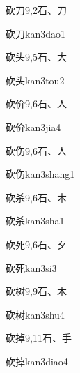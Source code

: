 \begin{entry}{砍刀}{9,2}{⽯、⼑}
  \begin{phonetics}{砍刀}{kan3dao1}
  \end{phonetics}
\end{entry}

\begin{entry}{砍头}{9,5}{⽯、⼤}
  \begin{phonetics}{砍头}{kan3tou2}
  \end{phonetics}
\end{entry}

\begin{entry}{砍价}{9,6}{⽯、⼈}
  \begin{phonetics}{砍价}{kan3jia4}
  \end{phonetics}
\end{entry}

\begin{entry}{砍伤}{9,6}{⽯、⼈}
  \begin{phonetics}{砍伤}{kan3shang1}
  \end{phonetics}
\end{entry}

\begin{entry}{砍杀}{9,6}{⽯、⽊}
  \begin{phonetics}{砍杀}{kan3sha1}
  \end{phonetics}
\end{entry}

\begin{entry}{砍死}{9,6}{⽯、⽍}
  \begin{phonetics}{砍死}{kan3si3}
  \end{phonetics}
\end{entry}

\begin{entry}{砍树}{9,9}{⽯、⽊}
  \begin{phonetics}{砍树}{kan3shu4}
  \end{phonetics}
\end{entry}

\begin{entry}{砍掉}{9,11}{⽯、⼿}
  \begin{phonetics}{砍掉}{kan3diao4}
  \end{phonetics}
\end{entry}


